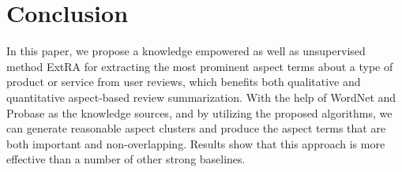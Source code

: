 \section{Conclusion}
\label{sec:conclusion}

In this paper, we propose a knowledge empowered
as well as unsupervised method ExtRA for 
extracting the most prominent aspect terms about a type of product 
or service from user reviews, which benefits both qualitative and 
quantitative aspect-based review summarization.
With the help of WordNet and Probase as the knowledge sources, 
and by utilizing the proposed algorithms, 
we can generate reasonable aspect clusters 
and produce the aspect terms that are both important
and non-overlapping. 
Results show that this approach is more
effective than a number of other strong baselines.
